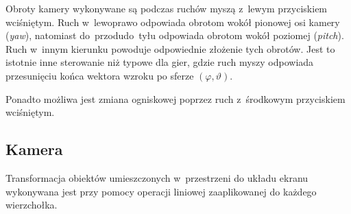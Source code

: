 \documentclass[12pt,a4paper]{article}
\begin{document}
Obroty kamery wykonywane są podczas ruchów myszą z~lewym przyciskiem wciśniętym.
Ruch w~lewo\dywiz prawo odpowiada obrotom wokół pionowej osi kamery (\textit{yaw}),
natomiast do~przodu\dywiz  do~tyłu odpowiada obrotom wokół poziomej (\textit{pitch}).
Ruch w~innym kierunku powoduje odpowiednie złożenie tych obrotów.
Jest to istotnie inne sterowanie niż typowe dla gier, gdzie ruch myszy odpowiada
przesunięciu końca wektora wzroku po sferze $(\varphi,\vartheta)$.

Ponadto możliwa jest zmiana ogniskowej poprzez ruch z~środkowym przyciskiem wciśniętym.

\subsection{Kamera}
Transformacja obiektów umieszczonych w~przestrzeni do układu ekranu wykonywana
jest przy pomocy operacji liniowej zaaplikowanej do każdego wierzchołka.
\end{document}
